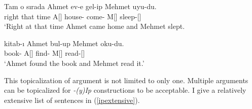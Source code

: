 \begin{exe}
\ex \label{ipvsremedy}
\gll Tam o sırada Ahmet ev-e gel-ip Mehmet uyu-du. \\ 
right that time A[{\Nom}] house-{\Dat} come-{\Pc} M[{\Nom}] sleep-{\Pst}[{\Tsg}] \\
\glt`Right at that time Ahmet came home and Mehmet slept.

\ex \label{ipvsremedy2}
\gll kitab-ı Ahmet bul-up Mehmet oku-du. \\ 
book-{\Acc} A[{\Nom}] find-{\Pc} M[{\Nom}] read-{\Pst}[{\Tsg}] \\
\glt`Ahmet found the book and Mehmet read it.'
\end{exe}

This topicalization of argument is not limited to only one. Multiple arguments can be topicalized for \textit{-(y)Ip} constructions to be acceptable. I give a relatively extensive list of sentences in (\ref{ipextensive}).

